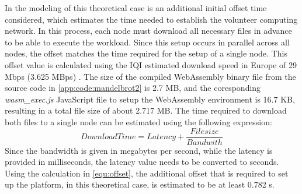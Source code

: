 In the modeling of this theoretical case is an additional initial offset time considered, which estimates the time needed to establish the volunteer computing network. In this process, each node must download all necessary files in advance to be able to execute the workload. Since this setup occurs in parallel across all nodes, the offset matches the time required for the setup of a single node. This offset value is calculated using the \ac{IQI} estimated download speed in Europe of 29 Mbps (3.625 MBps) \cite{backend:latency}. The size of the compiled WebAssembly binary file from the source code in \autoref{app:code:mandelbrot2} is 2.7 MB, and the coresponding \emph{wasm\_exec.js} JavaScript file to setup the WebAssembly environment is 16.7 KB, resulting in a total file size of about 2.717 MB. The time required to download both files to a single node can be estimated using the following expression:
\begin{equation}
  DownloadTime = Latency + \frac{Filesize}{Bandwith} 
  \label{equ:offset}
\end{equation}
Since the bandwidth is given in megabytes per second, while the latency is provided in milliseconds, the latency value needs to be converted to seconds. Using the calculation in \eqref{equ:offset}, the additional offset that is required to set up the platform, in this theoretical case, is estimated to be at least 0.782 s.

